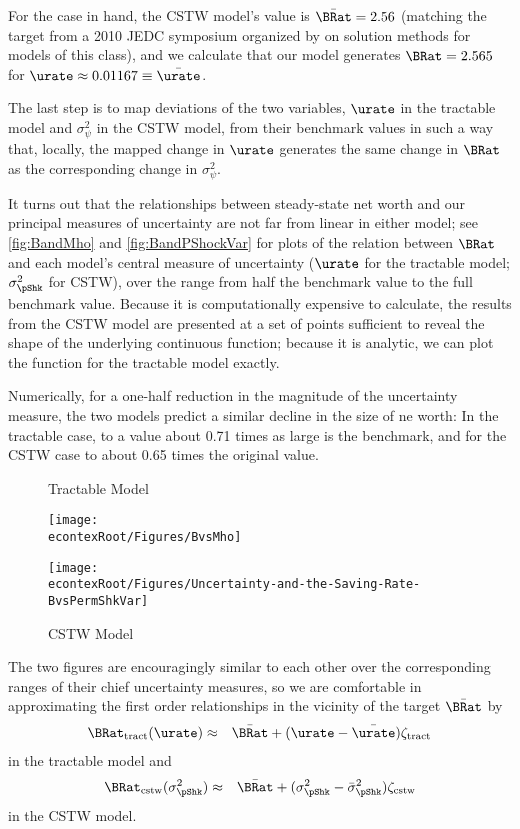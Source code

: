 \documentclass[../../cjSOE.tex]{subfiles}
\begin{document}
For the case in hand, the CSTW model's value is $\bar{\BRat} = 2.56$ (matching the target from a 2010 JEDC symposium organized by \cite{djjKS} on solution methods for models of this class), and we calculate that our model generates $\BRat=2.565$ for $\urate \approx 0.01167\equiv\bar{\urate}$. 

The last step is to map deviations of the two variables, $\urate$ in the tractable model and $\sigma^{2}_{\psi}$ in the CSTW model, from their benchmark values in such a way that, locally, the mapped change in $\urate$ generates the same change in $\BRat$ as the corresponding change in $\sigma^{2}_{\psi}$.

It turns out that the relationships between steady-state net worth and our principal measures of uncertainty are not far from linear in either model; see \ref{fig:BandMho} and \ref{fig:BandPShockVar} for plots of the relation between $\BRat$ and each model's central measure of uncertainty ($\urate$ for the tractable model; $\sigma^{2}_{\pShk}$ for CSTW), over the range from half the benchmark value to the full benchmark value.  Because it is computationally expensive to calculate, the results from the CSTW model are presented at a set of points sufficient to reveal the shape of the underlying continuous function; because it is analytic, we can plot the function for the tractable model exactly.

Numerically, for a one-half reduction in the magnitude of the uncertainty measure, the two models predict a similar decline in the size of ne worth: In the tractable case, to a value about 0.71 times as large is the benchmark, and for the CSTW case to about 0.65 times the original value.

\begin{figure}
  \caption{Tractable Model}
  \texttt{[image: \\econtexRoot/Figures/BvsMho]}
  \caption{CSTW Model}
  \texttt{[image: \\econtexRoot/Figures/Uncertainty-and-the-Saving-Rate-BvsPermShkVar]}
\end{figure}

The two figures are encouragingly similar to each other over the corresponding ranges of their chief uncertainty measures, so we are comfortable in approximating the first order relationships in the vicinity of the target $\bar{\BRat}$ by 
\begin{eqnarray}
  \BRat_\text{tract}(\urate) & \approx & \bar{\BRat} + (\urate-\bar{\urate})\zeta_{\text{tract}} 
\end{eqnarray}
in the tractable model and 
\begin{eqnarray}
  \BRat_{\text{cstw}}(\sigma^{2}_{\pShk}) & \approx & \bar{\BRat} + (\sigma^{2}_{\pShk}-\bar{\sigma}^{2}_{\pShk})\zeta_{\text{cstw}} 
\end{eqnarray}
in the CSTW model.
\end{document}

